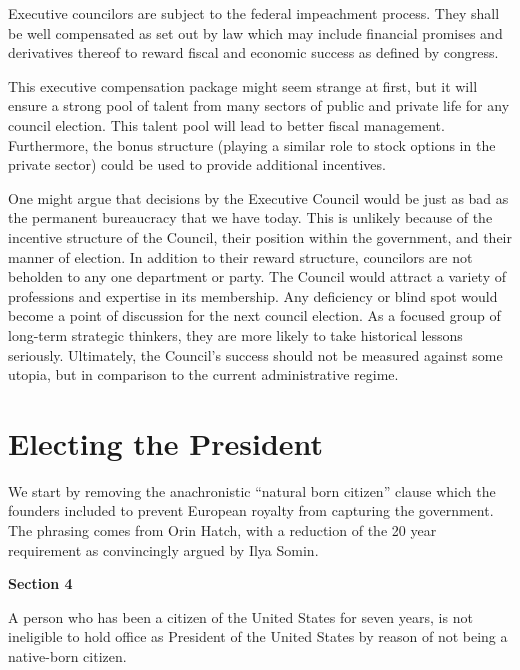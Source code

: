 \documentclass{article}
\newcommand{\quotes}[1]{``#1''}
\begin{document}
\begin{quoting}
Executive councilors are subject to the federal impeachment process. They shall be well compensated as set out by law which may include financial promises and derivatives thereof to reward fiscal and economic success as defined by congress.
\end{quoting}

This executive compensation package might seem strange at first, but it will ensure a strong pool of talent from many sectors of public and private life for any council election. This talent pool will lead to better fiscal management\cite{Sowell}. Furthermore, the bonus structure (playing a similar role to stock options in the private sector) could be used to provide additional incentives.

One might argue that decisions by the Executive Council would be just as bad as the permanent bureaucracy that we have today. This is unlikely because of the incentive structure of the Council, their position within the government, and their manner of election. In addition to their reward structure, councilors are not beholden to any one department or party. The Council would attract a variety of professions and expertise in its membership. Any deficiency or blind spot would become a point of discussion for the next council election. As a focused group of long-term strategic thinkers, they are more likely to take historical lessons seriously. Ultimately, the Council's success should not be measured against some utopia, but in comparison to the current administrative regime.

\section{Electing the President}

We start by removing the anachronistic \quotes{natural born citizen} clause which the founders included to prevent European royalty from capturing the government. The phrasing comes from Orin Hatch\cite{Somin_Hatch}, with a reduction of the 20 year requirement as convincingly argued by Ilya Somin\cite{Somin_NBC}.

\begin{quoting}
\textbf{Section 4}

A person who has been a citizen of the United States for seven years, is not ineligible to hold office as President of the United States by reason of not being a native-born citizen.
\end{quoting}
\end{document}
